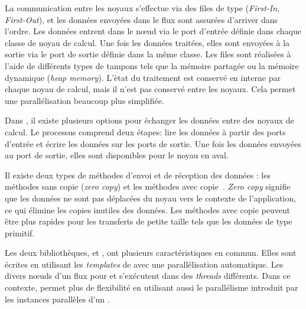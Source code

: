La communication entre les noyaux s'effectue via des files de type  (\emph{First-In, First-Out}), et les donn\'ees envoy\'ees dans le flux sont assurées d'arriver dans l'ordre. Les donn\'ees entrent dans le nœud via le port d'entr\'ee d\'efinie dans chaque classe de noyau de calcul. Une fois les donn\'ees trait\'ees, elles sont envoy\'ees \`a la sortie via le port de sortie d\'efinie dans la m\^eme classe.  Les files sont réalisées \`a l'aide de diff\'erents types de tampons tels que la m\'emoire partag\'ee ou la m\'emoire dynamique (\emph{heap memory}). L'\`etat du traitement est conserv\'e en interne par chaque noyau de calcul, mais il n'est pas conserv\'e entre les noyaux. Cela permet une parall\'elisation beaucoup plus simplifi\'ee.


%
Dans , il existe plusieurs options pour \'echanger les donn\'ees entre des noyaux de calcul. Le processus comprend deux \'etapes: lire les donn\'ees \`a partir des ports d'entr\'ee et \'ecrire les donn\'ees sur les ports de sortie. Une fois les données envoy\'ees au port de sortie, elles sont disponibles pour le noyau en aval.



Il existe deux types de m\'ethodes d'envoi et de r\'eception des donn\'ees : les m\'ethodes sans copie (\emph{zero copy}) et les m\'ethodes avec copie~\citep{accessingDataInRaftLib}. \emph{Zero copy} signifie que les donn\'ees ne sont pas d\'eplac\'ees du noyau vers le contexte de l'application, ce qui \'elimine les copies inutiles des donn\'ees. Les m\'ethodes avec copie peuvent \^etre plus rapides pour les transferts de petite taille tels que les donn\'ees de type primitif.
%


Les deux biblioth\`eques,  et , ont plusieurs caract\'eristiques en commun. Elles sont \'ecrites en utilisant les \emph{templates} de  avec une parall\'elisation automatique. Les divers nœuds d'un flux pour  et  s'ex\'ecutent dans des \emph{threads} diff\'erents. Dans ce contexte,  permet plus de flexibilit\'e en utilisant aussi le parall\'elisme introduit par les instances parall\`eles d'un . 

